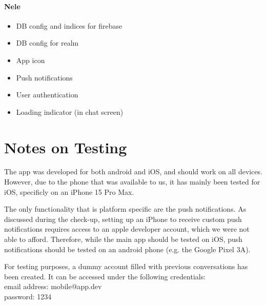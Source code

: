 \documentclass{article}
\begin{document}
\paragraph{Nele}
\begin{itemize}
\item DB config and indices for firebase
\item DB config for realm
\item App icon
\item Push notifications
\item User authentication
\item Loading indicator (in chat screen)
\end{itemize}

\section{Notes on Testing}
The app was developed for both android and iOS, and should work on all devices. However, due to the phone that was available to us, it has mainly been tested for iOS, specificly on an iPhone 15 Pro Max.

The only functionality that is platform specific are the push notifications. As discussed during the check-up, setting up an iPhone to receive custom push notifications requires access to an apple developer account, which we were not able to afford. Therefore, while the main app should be tested on iOS, push notifications should be tested on an android phone (e.g. the Google Pixel 3A).  

For testing purposes, a dummy account filled with previous conversations has been created. It can be accessed under the following credentials: \\
email address: mobile@app.dev \\
password: 1234
\end{document}
